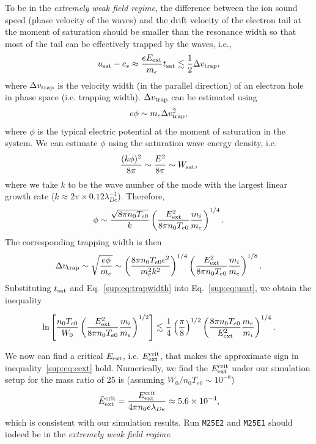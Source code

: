 \documentclass[%
 reprint,
 amsmath,
 amssymb,
 aps,
 prx,
floatfix,
superscriptaddress
]{revtex4-2}
\begin{document}
To be in the {\it extremely weak field regime}, the difference between the ion sound speed (phase velocity of the waves) and the drift velocity of the electron tail at the moment of saturation should be smaller than the resonance width so that most of the tail can be effectively trapped by the waves, i.e., 
\begin{equation}
    \label{sup:eq:usat}
    u_{\rm{sat}} - c_s  \approx \frac{e E_{\rm{ext}}}{m_e}t_{\rm{sat}} \lesssim \frac{1}{2}  \Delta v_{\rm{trap}},
\end{equation}
where $\Delta v_{\rm{trap}}$ is the velocity width (in the parallel direction) of an electron hole in phase space (i.e. trapping width).
$\Delta v_{\rm{trap}}$ can be estimated using 
\begin{equation}
    e\phi \sim m_e \Delta v_{\rm{trap}}^2,
\end{equation}
where $\phi$ is the typical electric potential at the moment of saturation in the system.
We can estimate $\phi$ using the saturation wave energy density, i.e.
\begin{equation}
     \frac{(k \phi)^2}{8\pi} \sim \frac{E^2}{8\pi}  \sim W_{\rm sat},
\end{equation}
where we take $k$ to be the wave number of the mode with the largest linear growth rate ($k\approx 2\pi \times 0.12 \lambda_{De}^{-1}$). 
Therefore,
\begin{equation}
\label{sup:eq:phi}
\phi \sim \frac{\sqrt{8\pi n_0 T_{e0}}}{k}  \left( \frac{E_{\rm{ext}}^2}{8\pi n_0 T_{e0}} \frac{m_i}{m_e}\right)^{1/4}.
\end{equation}
The corresponding trapping width is then
\begin{equation}
\label{sup:eq:trapwidth}
   \Delta v_{\rm{trap}} \sim  \sqrt{ \frac{e \phi }{m_e} } \sim \left( \frac{8\pi n_0 T_{e0}e^2}{m_e^2 k^2}\right)^{1/4} \left(  \frac{E_{\rm{ext}}^2}{8\pi n_0 T_{e0}} \frac{m_i}{m_e} \right)^{1/8}.
\end{equation}
Substituting $t_{\rm{sat}}$ and Eq.~\eqref{sup:eq:trapwidth} into Eq.~\eqref{sup:eq:usat}, we obtain the inequality

\begin{equation}
\label{sup:eq:eext}
    \ln \left[\frac{n_0 T_{e0}}{W_0} \left( \frac{E_{\rm{ext}}^2}{8\pi n_0 T_{e0}}\frac{m_i}{m_e}\right)^{1/2}\right]  \lesssim \frac{1}{4}\left(\frac{\pi}{8}\right)^{1/2} \left(  \frac{8\pi n_0 T_{e0}}{E_{\rm{ext}}^2} \frac{m_e}{m_i} \right)^{1/4}.
\end{equation}


We now can find a critical $E_{\rm{ext}}$, i.e. $E_{\rm{ext}}^{\rm{crit}}$, that makes the approximate sign in inequality~\eqref{sup:eq:eext} hold.
Numerically, we find the $E_{\rm{ext}}^{\rm{crit}}$ under our simulation setup for the mass ratio of 25 is (assuming $W_0/n_0 T_{e0} \sim 10^{-8}$)
\begin{equation}
   \tilde{E}_{\rm{ext}}^{\rm{crit}}= \frac{E_{\rm{ext}}^{\rm{crit}}}{4\pi n_0 e \lambda_{De}} \approx 5.6 \times 10^{-4},
\end{equation}
which is consistent with our simulation results. Run {\tt M25E2} and {\tt M25E1} should indeed be in the {\it extremely weak field regime}.
\end{document}
